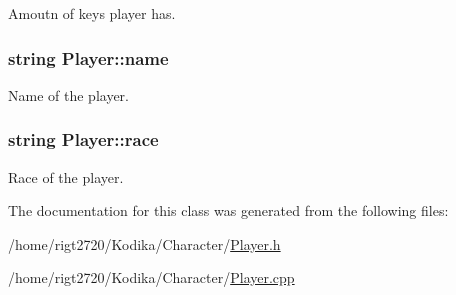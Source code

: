 Amoutn of keys player has. 

\hypertarget{classPlayer_acf0355128a99ee20ad9931b760fb2de1}{
\subsubsection[{name}]{\setlength{\rightskip}{0pt plus 5cm}string Player\-::name\hspace{0.3cm}{\ttfamily [private]}}}\label{classPlayer_acf0355128a99ee20ad9931b760fb2de1}


Name of the player. 

\hypertarget{classPlayer_a5130cb6c4233cd7ad1212af0d1790e58}{
\subsubsection[{race}]{\setlength{\rightskip}{0pt plus 5cm}string Player\-::race\hspace{0.3cm}{\ttfamily [private]}}}\label{classPlayer_a5130cb6c4233cd7ad1212af0d1790e58}


Race of the player. 



The documentation for this class was generated from the following files\-:\begin{DoxyCompactItemize}
\item 
/home/rigt2720/\-Kodika/\-Character/\hyperlink{Player_8h}{Player.\-h}\item 
/home/rigt2720/\-Kodika/\-Character/\hyperlink{Player_8cpp}{Player.\-cpp}\end{DoxyCompactItemize}
